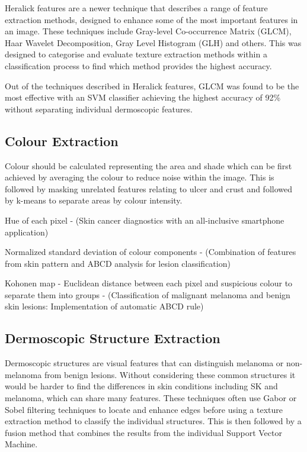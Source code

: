 \documentclass[12pt]{report}
\begin{document}
Heralick features are a newer technique that describes a range of feature extraction methods, designed to enhance some of the most important features in an image. These techniques include Gray-level Co-occurrence Matrix (GLCM), Haar Wavelet Decomposition, Gray Level Histogram (GLH) and others. This was designed to categorise and evaluate texture extraction methods within a classification process to find which method provides the highest accuracy.

Out of the techniques described in Heralick features, GLCM was found to be the most effective with an SVM classifier achieving the highest accuracy of 92\% without separating individual dermoscopic features.

\subsection{Colour Extraction}
Colour should be calculated representing the area and shade which can be first achieved by averaging the colour to reduce noise within the image. This is followed by masking unrelated features relating to ulcer and crust and followed by k-means to separate areas by colour intensity.

Hue of each pixel - (Skin cancer diagnostics with an all-inclusive smartphone application)

Normalized standard deviation of colour components - (Combination of features from skin pattern and ABCD analysis for lesion classification)

Kohonen map - Euclidean distance between each pixel and suspicious colour to separate them into groups - (Classification of malignant melanoma and benign skin lesions: Implementation of automatic ABCD rule)

\subsection{Dermoscopic Structure Extraction}
Dermoscopic structures are visual features that can distinguish melanoma or non-melanoma from benign lesions. Without considering these common structures it would be harder to find the differences in skin conditions including SK and melanoma, which can share many features. These techniques often use Gabor or Sobel filtering techniques to locate and enhance edges before using a texture extraction method to classify the individual structures. This is then followed by a fusion method that combines the results from the individual Support Vector Machine.
\end{document}
